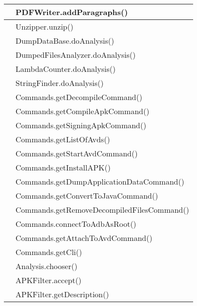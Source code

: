 \begin{center}
\begin{longtable}{ |C{3cm} |C{10.5cm}|}
                     & PDFWriter.addParagraphs()                  \\\hline
                     & Unzipper.unzip()                           \\\hline
                     & DumpDataBase.doAnalysis()                  \\\hline
                     & DumpedFilesAnalyzer.doAnalysis()           \\\hline
                     & LambdaCounter.doAnalysis()                 \\\hline
                     & StringFinder.doAnalysis()                  \\\hline
                     & Commands.getDecompileCommand()             \\\hline
                     & Commands.getCompileApkCommand()            \\\hline
                     & Commands.getSigningApkCommand()            \\\hline
                     & Commands.getListOfAvds()                   \\\hline
                     & Commands.getStartAvdCommand()              \\\hline
                     & Commands.getInstallAPK()                   \\\hline
                     & Commands.getDumpApplicationDataCommand()   \\\hline
                     & Commands.getConvertToJavaCommand()         \\\hline
                     & Commands.getRemoveDecompiledFilesCommand() \\\hline
                     & Commands.connectToAdbAsRoot()              \\\hline
                     & Commands.getAttachToAvdCommand()           \\\hline
                     & Commands.getCli()                          \\\hline
                     & Analysis.chooser()                         \\\hline
                     & APKFilter.accept()                         \\\hline
                     & APKFilter.getDescription()                 \\\hline

\end{longtable}
\end{center}
